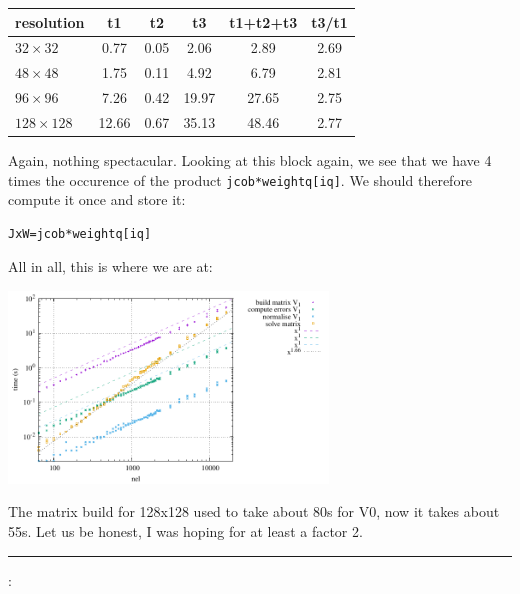 \begin{center}
\begin{tabular}{lccccc}
\hline
resolution & t1 & t2 & t3 & t1+t2+t3 & t3/t1\\ 
\hline
\hline
$32\times 32$   &  0.77 & 0.05 &  2.06 &  2.89 & 2.69 \\
$48\times 48$   &  1.75 & 0.11 &  4.92 &  6.79 & 2.81 \\
$96\times 96$   &  7.26 & 0.42 & 19.97 & 27.65 & 2.75 \\
$128\times 128$ &  12.66& 0.67 & 35.13 & 48.46 & 2.77 \\ 
\hline
\end{tabular}
\end{center}
Again, nothing spectacular.
Looking at this block again, we see that we have 4 times the occurence of the product {\tt jcob*weightq[iq]}.
We should therefore compute it once and store it:
\begin{lstlisting}
JxW=jcob*weightq[iq]
\end{lstlisting}

All in all, this is where we are at:
\begin{center}
\includegraphics[width=8.5cm]{python_codes/fieldstone_150/results/times_V4}
\end{center}
The matrix build for 128x128 used to take about 80s for V0, now it takes 
about 55s. Let us be honest, I was hoping for at least a factor 2. 



\par\noindent\rule{\textwidth}{0.4pt}

\vspace{.5cm}

\begin{center}
\end{center}

\vspace{.5cm}

\Literature:\\


